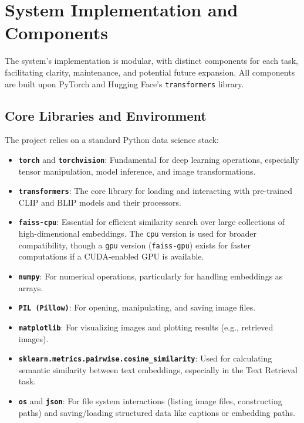 \documentclass{article}
\begin{document}
\section{System Implementation and Components}
\label{sec:implementation}


The system's implementation is modular, with distinct components for each task, facilitating clarity, maintenance, and potential future expansion. All components are built upon PyTorch and Hugging Face's \texttt{transformers} library.

\subsection{Core Libraries and Environment}
The project relies on a standard Python data science stack:
\begin{itemize}
    \item \textbf{\texttt{torch}} and \textbf{\texttt{torchvision}}: Fundamental for deep learning operations, especially tensor manipulation, model inference, and image transformations.
    \item \textbf{\texttt{transformers}}: The core library for loading and interacting with pre-trained CLIP and BLIP models and their processors.
    \item \textbf{\texttt{faiss-cpu}}: Essential for efficient similarity search over large collections of high-dimensional embeddings. The \texttt{cpu} version is used for broader compatibility, though a \texttt{gpu} version (\texttt{faiss-gpu}) exists for faster computations if a CUDA-enabled GPU is available.
    \item \textbf{\texttt{numpy}}: For numerical operations, particularly for handling embeddings as arrays.
    \item \textbf{\texttt{PIL (Pillow)}}: For opening, manipulating, and saving image files.
    \item \textbf{\texttt{matplotlib}}: For visualizing images and plotting results (e.g., retrieved images).
    \item \textbf{\texttt{sklearn.metrics.pairwise.cosine\_similarity}}: Used for calculating semantic similarity between text embeddings, especially in the Text Retrieval task.
    \item \textbf{\texttt{os}} and \textbf{\texttt{json}}: For file system interactions (listing image files, constructing paths) and saving/loading structured data like captions or embedding paths.
\end{itemize}
\end{document}
